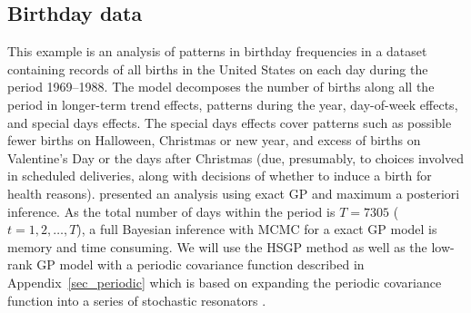%


\subsection{Birthday data}\label{sec_birthday}
%
This example is an analysis of patterns in birthday frequencies in a dataset containing records of all births in the United States on each day during the period 1969–1988. The model decomposes the number of births along all the period in longer-term trend effects, patterns during the year, day-of-week effects, and special days effects. The special days effects cover patterns such as possible fewer births on Halloween, Christmas or new year, and excess of births on Valentine’s Day or the days after Christmas (due, presumably, to choices involved in scheduled deliveries, along with decisions of whether to induce a birth for health reasons). \citet{gelman2013bayesian} presented an analysis using exact GP and maximum a posteriori inference. As the total number of days within the period is $T=7305$ ($t=1,2,\dots,T$), a full Bayesian inference with MCMC for a exact GP model is memory and time consuming. We will use the HSGP method as well as the low-rank GP model with a periodic covariance function described in Appendix~\ref{sec_periodic} which is based on expanding the periodic covariance function into a series of stochastic resonators \citep{solin2014explicit}.

